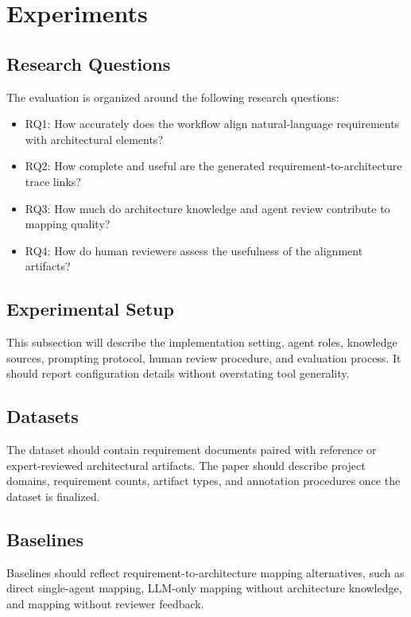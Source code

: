 \section{Experiments}
\label{experiments}

\subsection{Research Questions}
\label{sec:exp-rqs}

The evaluation is organized around the following research questions:
\begin{itemize}[leftmargin=*]
  \item RQ1: How accurately does the workflow align natural-language requirements with architectural elements?
  \item RQ2: How complete and useful are the generated requirement-to-architecture trace links?
  \item RQ3: How much do architecture knowledge and agent review contribute to mapping quality?
  \item RQ4: How do human reviewers assess the usefulness of the alignment artifacts?
\end{itemize}

\subsection{Experimental Setup}
\label{sec:exp-setup}

This subsection will describe the implementation setting, agent roles, knowledge sources, prompting protocol, human review procedure, and evaluation process.
It should report configuration details without overstating tool generality.

\subsection{Datasets}
\label{sec:exp-datasets}

The dataset should contain requirement documents paired with reference or expert-reviewed architectural artifacts.
The paper should describe project domains, requirement counts, artifact types, and annotation procedures once the dataset is finalized.

\subsection{Baselines}
\label{sec:exp-baselines}

Baselines should reflect requirement-to-architecture mapping alternatives, such as direct single-agent mapping, LLM-only mapping without architecture knowledge, and mapping without reviewer feedback.

